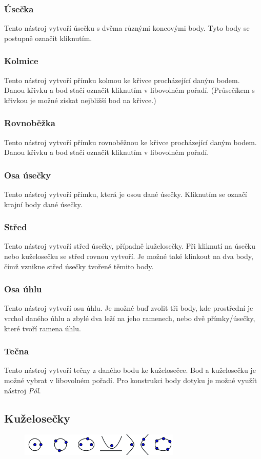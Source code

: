 \documentclass[11pt]{article}
\begin{document}
    \subsubsection{Úsečka}
    Tento nástroj vytvoří úsečku s dvěma různými koncovými body. Tyto body se postupně označit kliknutím.
    \subsubsection{Kolmice}
    Tento nástroj vytvoří přímku kolmou ke křivce procházející daným bodem. Danou křivku a bod stačí označit kliknutím v libovolném pořadí. (Průsečíkem s křivkou je možné získat nejbližší bod na křivce.)
    \subsubsection{Rovnoběžka}
    Tento nástroj vytvoří přímku rovnoběžnou ke křivce procházející daným bodem. Danou křivku a bod stačí označit kliknutím v libovolném pořadí.
    \subsubsection{Osa úsečky}
    Tento nástroj vytvoří přímku, která je osou dané úsečky. Kliknutím se označí krajní body dané úsečky.
    \subsubsection{Střed}
    Tento nástroj vytvoří střed úsečky, případně kuželosečky. Při kliknutí na úsečku nebo kuželosečku se střed rovnou vytvoří. Je možné také klinkout na dva body, čímž vznikne střed úsečky tvořené těmito body.
    \subsubsection{Osa úhlu}
    Tento nástroj vytvoří osu úhlu. Je možné buď zvolit tři body, kde prostřední je vrchol daného úhlu a zbylé dva leží na jeho ramenech, nebo dvě přímky/úsečky, které tvoří ramena úhlu.
    \subsubsection{Tečna}
    Tento nástroj vytvoří tečny z daného bodu ke kuželosečce. Bod a kuželosečku je možné vybrat v libovolném pořadí. Pro konstrukci body dotyku je možné využít nástroj \textit{Pól}.

    \subsection{Kuželosečky}
    \vspace{-10pt}
    \begin{figure}[h]
        \begin{center}
        \includegraphics[scale=0.5]{imgs/conic_tools.png}
        \end{center}
    \end{figure}
    \vspace{-25pt}
\end{document}
